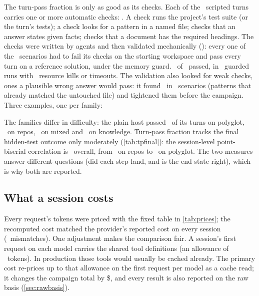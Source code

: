 The turn-pass fraction is only as good as its checks. Each of the \RgNTurnsScripted\ scripted turns carries one or
more automatic checks: \RgCheckKinds. A  check runs the project's test suite (or the turn's tests); a
 check looks for a pattern in a named file;  checks that an answer states given
facts;  checks that a document has the required headings. The checks were written by agents
and then validated mechanically (): every one of the
\RgValN\ scenarios had to fail its checks on the starting workspace and pass every turn on a reference solution,
under the memory guard. \RgValOK\ of \RgValN\ passed, in \RgValRuns\ guarded runs with \RgValKills\ resource kills
or timeouts. The validation also looked for weak checks, ones a plausible wrong answer would pass: it found
\RgValWeak\ in \RgValWeakScen\ scenarios (patterns that already matched the untouched file) and tightened them before
the campaign. Three examples, one per family:


The families differ in difficulty: the plain host passed \RgAnchorTPPolyglot\ of its turns on polyglot,
\RgAnchorTPRepos\ on repos, \RgAnchorTPMixed\ on mixed and \RgAnchorTPKnowledge\ on knowledge. Turn-pass fraction
tracks the final hidden-test outcome only moderately (\cref{tab:tpfinal}): the session-level point-biserial
correlation is \RgPbisAll\ overall, from \RgPbisRepos\ on repos to \RgPbisPolyglot\ on polyglot. The two
measures answer different questions (did each step land, and is the end state right), which is why both are
reported.

\begin{table}[htbp]
\centering\small
\caption{Correlation between a session's turn-pass fraction and whether it passed the final hidden tests
(point-biserial, all sessions), by arm and by family.}
\label{tab:tpfinal}

\end{table}

\subsection{What a session costs}

Every request's tokens were priced with the fixed table in \cref{tab:prices}; the recomputed cost matched
the provider's reported cost on every session (\CostMismatch\ mismatches). One adjustment makes the
comparison fair. A session's first request on each model carries the shared tool definitions (an allowance of
\ToolsAllowance\ tokens). In production those tools would usually be cached already. The primary
 cost re-prices up to that allowance on the first request per model as a cache read; it
changes the campaign total by \$\ToolsDeltaTotal, and every result is also reported on the raw basis
(\cref{sec:rawbasis}).

